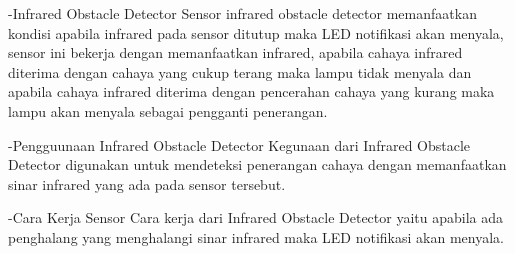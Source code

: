-Infrared Obstacle Detector
	Sensor infrared obstacle detector memanfaatkan kondisi apabila infrared pada sensor ditutup maka LED notifikasi akan menyala,
sensor ini bekerja dengan memanfaatkan infrared, apabila cahaya infrared diterima dengan cahaya yang cukup terang maka lampu tidak menyala dan apabila 
cahaya infrared diterima dengan pencerahan cahaya yang kurang maka lampu akan menyala sebagai pengganti penerangan.

-Pengguunaan Infrared Obstacle Detector
	Kegunaan dari Infrared Obstacle Detector digunakan untuk mendeteksi penerangan cahaya dengan memanfaatkan sinar infrared yang ada pada sensor tersebut.
 
-Cara Kerja Sensor
	Cara kerja dari Infrared Obstacle Detector yaitu apabila ada penghalang yang menghalangi sinar infrared maka LED notifikasi akan menyala.

